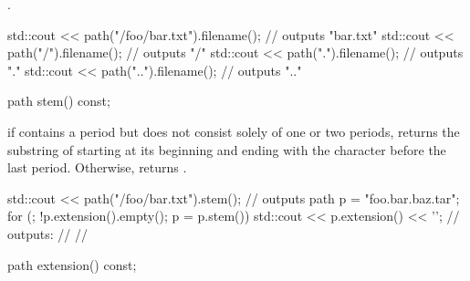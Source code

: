 \begin{itemdescr}
\pnum
\returns {}.

\pnum
\begin{example}
\begin{codeblock}
std::cout << path("/foo/bar.txt").filename(); // outputs "bar.txt"
std::cout << path("/").filename();            // outputs "/"
std::cout << path(".").filename();            // outputs "."
std::cout << path("..").filename();           // outputs ".."
\end{codeblock}
\end{example}
\end{itemdescr}

\begin{itemdecl}
path stem() const;
\end{itemdecl}

\begin{itemdescr}
\pnum
\returns if  contains a period but does not
  consist solely of one or two periods, returns
  the substring of  starting at its beginning and
  ending with the character before the last period. Otherwise,
  returns .

\pnum
\begin{example}
\begin{codeblock}
std::cout << path("/foo/bar.txt").stem(); // outputs 
path p = "foo.bar.baz.tar";
for (; !p.extension().empty(); p = p.stem())
  std::cout << p.extension() << '\n';
  // outputs: 
  //          
  //          
\end{codeblock}
\end{example}
\end{itemdescr}

\begin{itemdecl}
path extension() const;
\end{itemdecl}

